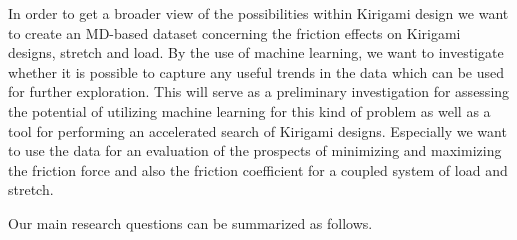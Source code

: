 In order to get a broader view of the possibilities within Kirigami design we want to create an \acrshort{MD}-based dataset concerning the friction effects on Kirigami designs, stretch and load. By the use of machine learning, we want to investigate whether it is possible to capture any useful trends in the data which can be used for further exploration. This will serve as a preliminary investigation for assessing the potential of utilizing machine learning for this kind of problem as well as a tool for performing an accelerated search of Kirigami designs. Especially we want to use the data for an evaluation of the prospects of minimizing and maximizing the friction force and also the friction coefficient for a coupled system of load and stretch. 


%
%
%
%






Our main research questions can be summarized as follows.


